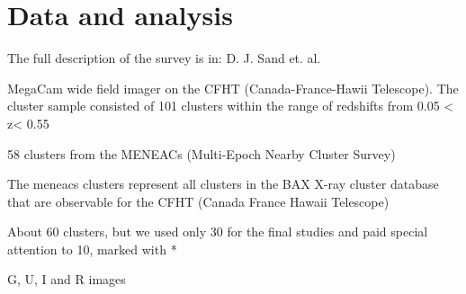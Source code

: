 \chapter{Data and analysis}

The full description of the survey is in: D. J. Sand et. al. \citeyear{Reference11}

MegaCam wide field imager on the CFHT (Canada-France-Hawii Telescope). The cluster sample consisted of 101 clusters within the range of redshifts from 0.05 < z< 0.55

58 clusters from the MENEACs (Multi-Epoch Nearby Cluster Survey)

The meneacs clusters represent all clusters in the BAX X-ray cluster database that are observable for the CFHT (Canada France Hawaii Telescope)

About 60 clusters, but we used only 30 for the final studies and paid special attention to 10, marked with *

G, U, I and R images

